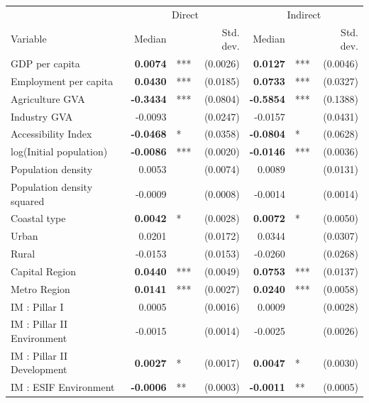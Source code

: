 \begin{table}[ht]
\centering
\addtolength{\tabcolsep}{-0.6em}
\begin{tabular}{l@{~~}rl@{~}r@{~~~~~}rl@{~}r}
   \toprule
 \multicolumn{1}{c}{} & \multicolumn{3}{c}{Direct} & \multicolumn{3}{c}{Indirect} \\ 
 Variable & Median && Std. dev. & Median && Std. dev. \\ 
 \midrule
GDP per capita & \textbf{0.0074} & *** & (0.0026) & \textbf{0.0127} & *** & (0.0046) \\ 
  Employment per capita & \textbf{0.0430} & *** & (0.0185) & \textbf{0.0733} & *** & (0.0327) \\ 
  Agriculture GVA & \textbf{-0.3434} & *** & (0.0804) & \textbf{-0.5854} & *** & (0.1388) \\ 
  Industry GVA & -0.0093 &  & (0.0247) & -0.0157 &  & (0.0431) \\ 
  Accessibility Index & \textbf{-0.0468} & * & (0.0358) & \textbf{-0.0804} & * & (0.0628) \\ 
  log(Initial population) & \textbf{-0.0086} & *** & (0.0020) & \textbf{-0.0146} & *** & (0.0036) \\ 
  Population density & 0.0053 &  & (0.0074) & 0.0089 &  & (0.0131) \\ 
  Population density squared & -0.0009 &  & (0.0008) & -0.0014 &  & (0.0014) \\ 
  Coastal type & \textbf{0.0042} & * & (0.0028) & \textbf{0.0072} & * & (0.0050) \\ 
  Urban & 0.0201 &  & (0.0172) & 0.0344 &  & (0.0307) \\ 
  Rural & -0.0153 &  & (0.0153) & -0.0260 &  & (0.0268) \\ 
  Capital Region & \textbf{0.0440} & *** & (0.0049) & \textbf{0.0753} & *** & (0.0137) \\ 
  Metro Region & \textbf{0.0141} & *** & (0.0027) & \textbf{0.0240} & *** & (0.0058) \\ 
  IM : Pillar I & 0.0005 &  & (0.0016) & 0.0009 &  & (0.0028) \\ 
  IM : Pillar II Environment & -0.0015 &  & (0.0014) & -0.0025 &  & (0.0026) \\ 
  IM : Pillar II Development & \textbf{0.0027} & * & (0.0017) & \textbf{0.0047} & * & (0.0030) \\ 
  IM : ESIF Environment & \textbf{-0.0006} & ** & (0.0003) & \textbf{-0.0011} & ** & (0.0005) \\ 

\end{tabular}
\end{table}

